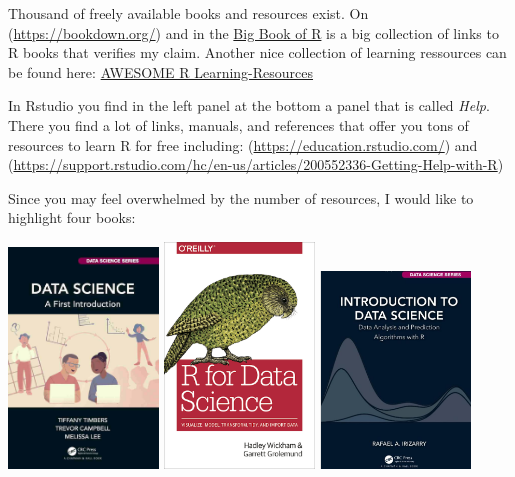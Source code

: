 \documentclass[
  12pt,
  oneside]{book}
\theoremstyle{definition}
\theoremstyle{definition}
\theoremstyle{definition}
\theoremstyle{definition}
\theoremstyle{remark}
\begin{document}
Thousand of freely available books and resources exist. On (\url{https://bookdown.org/}) and in the \href{www.bigbookofr.com}{Big Book of R} is a big collection of links to R books that verifies my claim. Another nice collection of learning ressources can be found here:
\href{https://github.com/iamericfletcher/awesome-r-learning-resources}{AWESOME R Learning-Resources}

In Rstudio you find in the left panel at the bottom a panel that is called \emph{Help}. There you find a lot of links, manuals, and references that offer you tons of resources to learn R for free including:
(\url{https://education.rstudio.com/})
and (\url{https://support.rstudio.com/hc/en-us/articles/200552336-Getting-Help-with-R})

Since you may feel overwhelmed by the number of resources, I would like to highlight four books:

\includegraphics[width=0.3\textwidth,height=\textheight]{fig/ds-a-first-intro-cover.jpg}
\includegraphics[width=0.3\textwidth,height=\textheight]{fig/rfordatas.png}
\includegraphics[width=0.3\textwidth,height=\textheight]{fig/irizarrybook.png}
\end{document}
